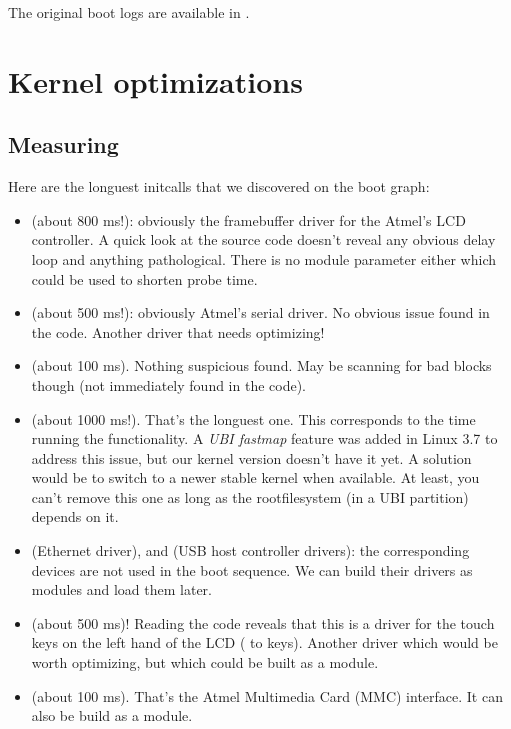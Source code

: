 The original boot logs are available in
.

\section{Kernel optimizations}

\subsection{Measuring}

Here are the longuest initcalls that we discovered on the boot graph:

\begin{itemize}
\item {} (about 800 ms!): obviously the
      framebuffer driver
      for the Atmel's LCD controller. A quick look at the source code
       doesn't reveal any obvious
      delay loop and anything pathological. There is no module parameter
      either which could be used to shorten probe time.
\item {} (about 500 ms!): obviously Atmel's serial
      driver. No obvious issue found in the code. Another driver
      that needs optimizing!
\item {} (about 100 ms). Nothing suspicious found.
      May be scanning for bad blocks though (not immediately found in
      the code).
\item {} (about 1000 ms!). That's the longuest one.
      This corresponds to the time running the 
      functionality. A {\em UBI fastmap} feature was added in Linux 3.7
      to address this issue, but our kernel version doesn't have it
      yet. A solution would be to switch to a newer stable kernel
      when available. At least, you can't remove this one
      as long as the rootfilesystem (in a UBI partition) depends on
      it.
\item {} (Ethernet driver),  and
       (USB host controller drivers): the
      corresponding devices are not used in the boot sequence. We can
      build their drivers as modules and load them later.
\item {} (about 500 ms)! Reading the code
      reveals that this is a driver for the touch keys on the left
      hand of the LCD ( to  keys). Another driver
      which would be worth optimizing, but which could be built as a module.
\item {} (about 100 ms). That's the Atmel Multimedia
      Card (MMC) interface. It can also be build as a module.
\end{itemize}

